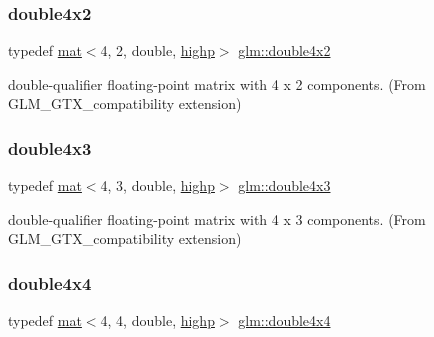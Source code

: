 \subsubsection{\texorpdfstring{double4x2}{double4x2}}
{\footnotesize\ttfamily typedef \hyperlink{structglm_1_1mat}{mat}$<$4, 2, double, \hyperlink{namespaceglm_a36ed105b07c7746804d7fdc7cc90ff25ac6f7eab42eacbb10d59a58e95e362074}{highp}$>$ \hyperlink{group__gtx__compatibility_ga5ca0eb6627cf8829e3cab6694d1a6452}{glm\+::double4x2}}



double-\/qualifier floating-\/point matrix with 4 x 2 components. (From G\+L\+M\+\_\+\+G\+T\+X\+\_\+compatibility extension) 

\mbox{\label{group__gtx__compatibility_ga2f73c8a3c9cd5198695163229f0ce754}} 
\subsubsection{\texorpdfstring{double4x3}{double4x3}}
{\footnotesize\ttfamily typedef \hyperlink{structglm_1_1mat}{mat}$<$4, 3, double, \hyperlink{namespaceglm_a36ed105b07c7746804d7fdc7cc90ff25ac6f7eab42eacbb10d59a58e95e362074}{highp}$>$ \hyperlink{group__gtx__compatibility_ga2f73c8a3c9cd5198695163229f0ce754}{glm\+::double4x3}}



double-\/qualifier floating-\/point matrix with 4 x 3 components. (From G\+L\+M\+\_\+\+G\+T\+X\+\_\+compatibility extension) 

\mbox{\label{group__gtx__compatibility_gaa0d75f4adb5cb1af3b1ba09720954306}} 
\subsubsection{\texorpdfstring{double4x4}{double4x4}}
{\footnotesize\ttfamily typedef \hyperlink{structglm_1_1mat}{mat}$<$4, 4, double, \hyperlink{namespaceglm_a36ed105b07c7746804d7fdc7cc90ff25ac6f7eab42eacbb10d59a58e95e362074}{highp}$>$ \hyperlink{group__gtx__compatibility_gaa0d75f4adb5cb1af3b1ba09720954306}{glm\+::double4x4}}



